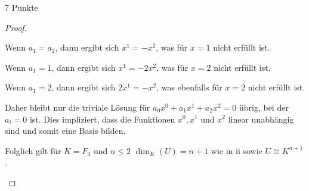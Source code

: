 \documentclass{problemset}
\begin{document}
\begin{problem}{7 Punkte}
\begin{proof}
\begin{enumerate}
              Wenn $a_1 = a_2$, dann ergibt sich $x^1 = - x^2$, was für $x = 1$ nicht erfüllt
              ist.

              Wenn $a_1 = 1$, dann ergibt sich $x^1 = -2x^2$, was für $x = 2$ nicht erfüllt
              ist.

              Wenn $a_1 = 2$, dann ergibt sich $2x^1 = -x^2$, was ebenfalls für $x = 2$ nicht
              erfüllt ist.

              Daher bleibt nur die triviale Lösung für $a_0x^0 + a_1x^1 + a_2x^2 = 0$ übrig,
              bei der $a_i = 0$ ist. Dies impliziert, dass die Funktionen $x^0, x^1$ und
              $x^2$ linear unabhängig sind und somit eine Basis bilden.

              Folglich gilt für $K = F_3$ und $n \leq 2$ $\dim_K(U) = n + 1$ wie in ii sowie
              $U \cong K^{n+1}$.
    \end{enumerate}
\end{proof}

\end{problem}
\end{document}
